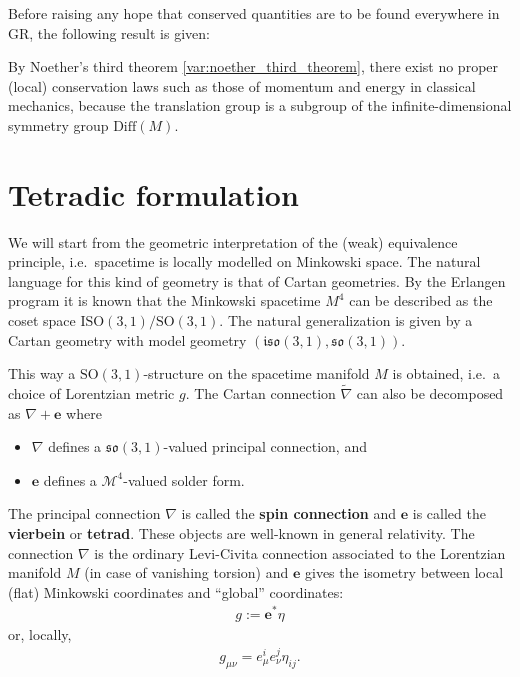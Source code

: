     Before raising any hope that conserved quantities are to be found everywhere in GR, the following result is given:
    \begin{property}
        By Noether's third theorem \ref{var:noether_third_theorem}, there exist no proper (local) conservation laws such as those of momentum and energy in classical mechanics, because the translation group is a subgroup of the infinite-dimensional symmetry group $\mathrm{Diff}(M)$.
    \end{property}

\section{Tetradic formulation}

    We will start from the geometric interpretation of the (weak) equivalence principle, i.e.~spacetime is locally modelled on Minkowski space. The natural language for this kind of geometry is that of Cartan geometries. By the Erlangen program it is known that the Minkowski spacetime $M^4$ can be described as the coset space $\mathrm{ISO}(3,1)/\mathrm{SO}(3,1)$. The natural generalization is given by a Cartan geometry with model geometry $(\mathfrak{iso}(3,1),\mathfrak{so}(3,1))$.

    \begin{property}
        This way a $\mathrm{SO}(3,1)$-structure on the spacetime manifold $M$ is obtained, i.e.~a choice of Lorentzian metric $g$. The Cartan connection $\widetilde{\nabla}$ can also be decomposed as $\nabla+\mathbf{e}$ where
        \begin{itemize}
            \item $\nabla$ defines a $\mathfrak{so}(3,1)$-valued principal connection, and
            \item $\mathbf{e}$ defines a $\mathcal{M}^4$-valued solder form.
        \end{itemize}
        The principal connection $\nabla$ is called the \textbf{spin connection} and $\mathbf{e}$ is called the \textbf{vierbein} or \textbf{tetrad}. These objects are well-known in general relativity. The connection $\nabla$ is the ordinary Levi-Civita connection associated to the Lorentzian manifold $M$ (in case of vanishing torsion) and $\mathbf{e}$ gives the isometry between local (flat) Minkowski coordinates and ``global'' coordinates:
        \begin{gather}
            g := \mathbf{e}^*\eta
        \end{gather}
        or, locally,
        \begin{gather}
            g_{\mu\nu} = e^i_\mu e^j_\nu\eta_{ij}.
        \end{gather}
    \end{property}

